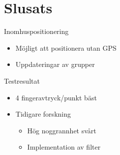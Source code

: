 \section{Slusats}
\begin{frame}{Inomhuspositionering}
	\begin{itemize}
		\item Möjligt att positionera utan GPS
		\item Uppdateringar av grupper
	\end{itemize}	
\end{frame}

\begin{frame}{Testresultat}
	\begin{itemize}
		\item 4 fingeravtryck/punkt bäst
		\item Tidigare forskning
			\begin{itemize}
				\item Hög noggrannhet svårt
				\item Implementation av filter
			\end{itemize}

	\end{itemize}
\end{frame}

